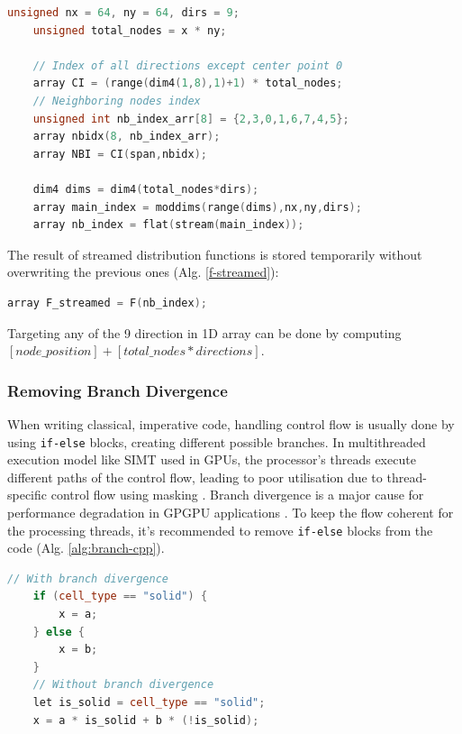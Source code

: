 \begin{lstlisting}[language=Cpp, caption=Creating ``current" (or main) index and neighboring index.]
	unsigned nx = 64, ny = 64, dirs = 9;
	unsigned total_nodes = x * ny;
	
	// Index of all directions except center point 0
	array CI = (range(dim4(1,8),1)+1) * total_nodes;
	// Neighboring nodes index
	unsigned int nb_index_arr[8] = {2,3,0,1,6,7,4,5};
	array nbidx(8, nb_index_arr);
	array NBI = CI(span,nbidx);
	
	dim4 dims = dim4(total_nodes*dirs);
	array main_index = moddims(range(dims),nx,ny,dirs);
	array nb_index = flat(stream(main_index));
\end{lstlisting}

The result of streamed distribution functions is stored temporarily without overwriting the previous ones (Alg. \ref{f-streamed}):

\begin{lstlisting}[language=Cpp, caption=Streaming step., label=f-streamed]
	array F_streamed = F(nb_index);
\end{lstlisting}

Targeting any of the 9 direction in 1D array can be done by computing $[node\_position] + [total\_nodes * directions]$. 

\subsubsection{Removing Branch Divergence}
When writing classical, imperative code, handling control flow is usually done by using \texttt{if-else} blocks, creating different possible branches. In multithreaded execution model like SIMT used in GPUs, the processor's threads execute different paths of the control flow, leading to poor utilisation due to thread-specific control flow using masking \cite{MCCOOL2012209}. Branch divergence is a major cause for performance degradation in GPGPU applications \cite{TAN2017649}. To keep the flow coherent for the processing threads, it's recommended to remove \texttt{if-else} blocks from the code (Alg. \ref{alg:branch-cpp}).

\begin{lstlisting}[language=Cpp, caption=Pseudo-code showcasing the removal of branch divergence by removing if statement., label=alg:branch-pseudo]
	// With branch divergence
	if (cell_type == "solid") {
		x = a;
	} else {
		x = b;
	}
	// Without branch divergence
	let is_solid = cell_type == "solid";
	x = a * is_solid + b * (!is_solid);
\end{lstlisting}

